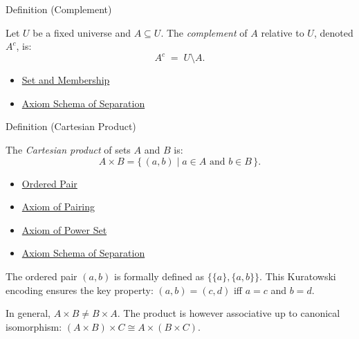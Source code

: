 \begin{definitionbox}{Definition (Complement)}
\begin{definition}[Complement]\label{def:complement}
Let $U$ be a fixed universe and $A \subseteq U$. The \emph{complement} of $A$
relative to $U$, denoted $A^c$, is:
\[
A^c \;=\; U \setminus A.
\]
\end{definition}
\end{definitionbox}

\begin{dependencies}
\begin{itemize}
  \item \hyperref[def:set-membership]{Set and Membership}
  \item \hyperref[ax:separation]{Axiom Schema of Separation}
\end{itemize}
\end{dependencies}

\begin{definitionbox}{Definition (Cartesian Product)}
\begin{definition}\label{def:cartesian-product}
The \emph{Cartesian product} of sets $A$ and $B$ is:
\[
A \times B = \{\, (a,b) \mid a \in A \text{ and } b \in B \,\}.
\]
\end{definition}
\end{definitionbox}

\begin{dependencies}
\begin{itemize}
  \item \hyperref[def:ordered-pair]{Ordered Pair}
  \item \hyperref[ax:pairing]{Axiom of Pairing}
  \item \hyperref[ax:power-set]{Axiom of Power Set}
  \item \hyperref[ax:separation]{Axiom Schema of Separation}
\end{itemize}
\end{dependencies}

\begin{remark*}
The ordered pair $(a,b)$ is formally defined as $\{\{a\},\{a,b\}\}$.
This Kuratowski encoding ensures the key property: $(a,b) = (c,d)$ iff
$a = c$ and $b = d$.
\end{remark*}

\begin{remark*}
In general, $A \times B \neq B \times A$. The product is however associative
up to canonical isomorphism: $(A \times B) \times C \cong A \times (B \times C)$.
\end{remark*}

